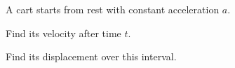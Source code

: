 A cart starts from rest with constant acceleration $a$.
\begin{subparts}
  \item Find its velocity after time $t$.
  \item Find its displacement over this interval.
\end{subparts}
